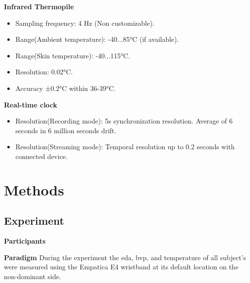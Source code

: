 \textbf{Infrared Thermopile}
\begin{itemize}
\item Sampling frequency: 4 Hz (Non customizable).
\item Range(Ambient temperature): -40...85°C (if available).
\item Range(Skin temperature): -40...115°C.
\item Resolution: 0.02°C.
\item Accuracy ±0.2°C within 36-39°C.
\end{itemize}

\textbf{Real-time clock}
\begin{itemize}
\item Resolution(Recording mode): 5s synchronization resolution. Average of 6 seconds in 6 million seconds drift.
\item Resolution(Streaming mode): Temporal resolution up to 0.2 seconds with connected device.
\end{itemize}

\section{Methods}
\subsection{Experiment}
\textbf{Participants}

\textbf{Paradigm}
During the experiment the \gls{eda}, \gls{bvp}, and temperature of all subject's were measured using the Empatica E4 wristband at its default location on the non-dominant side. 

